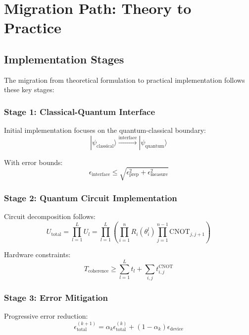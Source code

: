 \documentclass{article}
\begin{document}
\section{Migration Path: Theory to Practice}

\subsection{Implementation Stages}
The migration from theoretical formulation to practical implementation follows these key stages:

\subsubsection{Stage 1: Classical-Quantum Interface}
Initial implementation focuses on the quantum-classical boundary:
\begin{equation}
|\psi_{\text{classical}}\rangle \xrightarrow{\text{interface}} |\psi_{\text{quantum}}\rangle
\end{equation}

With error bounds:
\begin{equation}
\epsilon_{\text{interface}} \leq \sqrt{\epsilon_{\text{prep}}^2 + \epsilon_{\text{measure}}^2}
\end{equation}

\subsubsection{Stage 2: Quantum Circuit Implementation}
Circuit decomposition follows:
\begin{equation}
U_{\text{total}} = \prod_{l=1}^L U_l = \prod_{l=1}^L \left(\prod_{i=1}^n R_i(\theta_i^l) \prod_{j=1}^{n-1} \text{CNOT}_{j,j+1}\right)
\end{equation}

Hardware constraints:
\begin{equation}
T_{\text{coherence}} \geq \sum_{l=1}^L t_l + \sum_{i,j} t_{i,j}^{\text{CNOT}}
\end{equation}

\subsubsection{Stage 3: Error Mitigation}
Progressive error reduction:
\begin{equation}
\epsilon_{\text{total}}^{(k+1)} = \alpha_k \epsilon_{\text{total}}^{(k)} + (1-\alpha_k)\epsilon_{\text{device}}
\end{equation}
\end{document}

